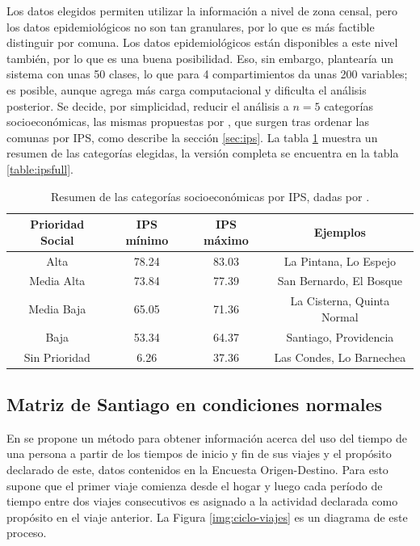 Los datos elegidos permiten utilizar la información a nivel de zona censal, pero los datos epidemiológicos no son tan granulares, por lo que es más factible distinguir por comuna. Los datos epidemiológicos están disponibles a este nivel también, por lo que es una buena posibilidad. Eso, sin embargo, plantearía un sistema con unas 50 clases, lo que para 4 compartimientos da unas 200 variables; es posible, aunque agrega más carga computacional y dificulta el análisis posterior. Se decide, por simplicidad, reducir el análisis a \(n = 5\) categorías socioeconómicas, las mismas propuestas por \cite{SEREMIRM2019}, que surgen tras ordenar las comunas por IPS, como describe la sección \ref{sec:ips}. La tabla \ref{table:ips-categ} muestra un resumen de las categorías elegidas, la versión completa se encuentra en la tabla \ref{table:ipsfull}. 

\begin{table}[h!]
\centering
\begin{tabular}{||c | c | c | c||} 
 \hline
 \textbf{Prioridad Social} & \textbf{IPS mínimo} & \textbf{IPS máximo} & \textbf{Ejemplos} \\ [0.5ex] 
 \hline
 Alta & 78.24 & 83.03 & La Pintana, Lo Espejo\\ 
 Media Alta & 73.84 & 77.39 & San Bernardo, El Bosque\\
 Media Baja & 65.05 & 71.36 & La Cisterna, Quinta Normal\\
 Baja & 53.34 & 64.37 & Santiago, Providencia\\
 Sin Prioridad & 6.26 & 37.36 & Las Condes, Lo Barnechea\\ [1ex] 
 \hline
\end{tabular}
\caption{Resumen de las categorías socioeconómicas por IPS, dadas por \cite{SEREMIRM2019}.}
\label{table:ips-categ}
\end{table}



\subsection{Matriz de Santiago en condiciones normales} \label{subsec:santiago-normal-eod}

En \cite{Munizaga2011} se propone un método para obtener información acerca del uso del tiempo de una persona a partir de los tiempos de inicio y fin de sus viajes y el propósito declarado de este, datos contenidos en la Encuesta Origen-Destino. Para esto supone que el primer viaje comienza desde el hogar y luego cada período de tiempo entre dos viajes consecutivos es asignado a la actividad declarada como propósito en el viaje anterior. La Figura \ref{img:ciclo-viajes} es un diagrama de este proceso. 

